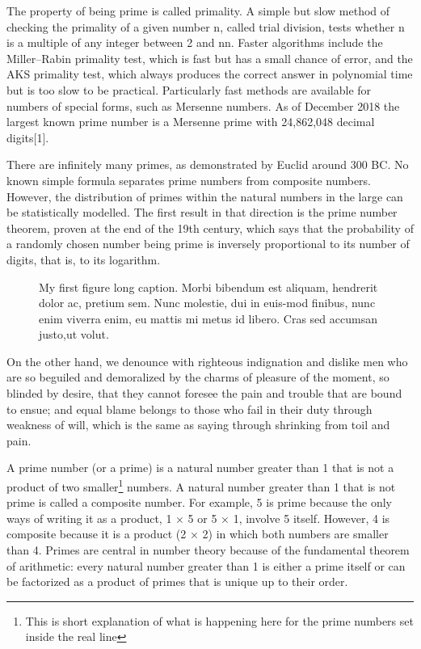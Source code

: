 The property of being prime is called primality. A simple but slow method of
checking the primality of a given number n, called trial
division, tests whether n is a multiple of any integer between
2 and { { {n}}}{ {n}}. Faster algorithms include the
Miller–Rabin primality test, which is fast but has a small chance of error, and
the AKS primality test, which always produces the correct answer in polynomial
time but is too slow to be practical. Particularly fast methods are available
for numbers of special forms, such as Mersenne numbers. As of December 2018 the
largest known prime number is a Mersenne prime with 24,862,048 decimal
digits[1].

There are infinitely many primes, as demonstrated by Euclid around 300 BC. No
known simple formula separates prime numbers from composite numbers. However,
the distribution of primes within the natural numbers in the large can be
statistically modelled. The first result in that direction is the prime number
theorem, proven at the end of the 19th century, which says that the probability
of a randomly chosen number being prime is inversely proportional to its number
of digits, that is, to its logarithm.

\begin{figure}[ht]
  \centering
  
  \caption[My first figure short caption]{My first figure long caption. Morbi
    bibendum est aliquam, hendrerit dolor ac, pretium sem. Nunc molestie, dui in
    euis-mod finibus, nunc enim viverra enim, eu mattis mi metus id libero. Cras
    sed accumsan justo,ut volut.}
  \label{fig:label}
\end{figure}

On the other hand, we denounce with righteous indignation and dislike men who
are so beguiled and demoralized by the charms of pleasure of the moment, so
blinded by desire, that they cannot foresee the pain and trouble that are bound
to ensue; and equal blame belongs to those who fail in their duty through
weakness of will, which is the same as saying through shrinking from toil and
pain.

A prime number (or a prime) is a natural number greater than 1 that is not a
product of two smaller\footnote{This is short explanation of what is
  happening here for the prime numbers set inside the real line} numbers. A
natural number greater than 1 that is not prime is called a composite
number. For example, 5 is prime because the only ways of writing it as a
product, 1 × 5 or 5 × 1, involve 5 itself. However, 4 is composite because it is
a product (2 × 2) in which both numbers are smaller than 4. Primes are central
in number theory because of the fundamental theorem of arithmetic: every natural
number greater than 1 is either a prime itself or can be factorized as a product
of primes that is unique up to their order.

